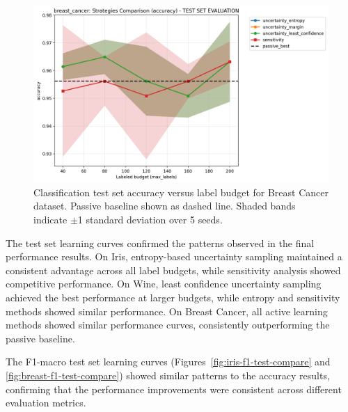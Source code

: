 \documentclass[conference]{IEEEtran}
\begin{document}
\begin{figure}[t]
\centering
\includegraphics[width=0.95\columnwidth]{figures/cls_breast_cancer_comparison_accuracy_test.png}
\caption{Classification test set accuracy versus label budget for Breast Cancer dataset. Passive baseline shown as dashed line. Shaded bands indicate $\pm$1 standard deviation over 5 seeds.}
\label{fig:breast-test-compare}
\end{figure}

The test set learning curves confirmed the patterns observed in the final performance results. On Iris, entropy-based uncertainty sampling maintained a consistent advantage across all label budgets, while sensitivity analysis showed competitive performance. On Wine, least confidence uncertainty sampling achieved the best performance at larger budgets, while entropy and sensitivity methods showed similar performance. On Breast Cancer, all active learning methods showed similar performance curves, consistently outperforming the passive baseline.

The F1-macro test set learning curves (Figures~\ref{fig:iris-f1-test-compare} and \ref{fig:breast-f1-test-compare}) showed similar patterns to the accuracy results, confirming that the performance improvements were consistent across different evaluation metrics.
\end{document}
